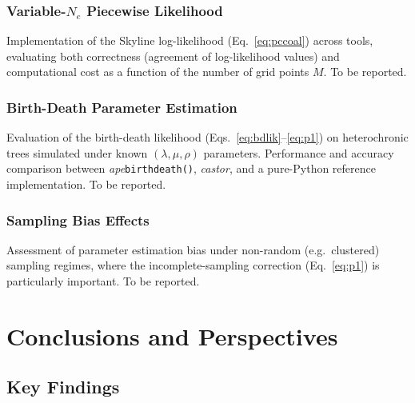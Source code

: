 \documentclass[11pt, a4paper]{article}
\newcommand{\ape}{\textit{ape}}
\newcommand{\castor}{\textit{castor}}
\begin{document}
\subsubsection{Variable-$N_e$ Piecewise Likelihood}

Implementation of the Skyline log-likelihood (Eq.~\ref{eq:pccoal}) across tools,
evaluating both correctness (agreement of log-likelihood values) and computational
cost as a function of the number of grid points $M$.
To be reported.

\subsubsection{Birth-Death Parameter Estimation}

Evaluation of the birth-death likelihood (Eqs.~\ref{eq:bdlik}--\ref{eq:p1}) on
heterochronic trees simulated under known $(\lambda, \mu, \rho)$ parameters.
Performance and accuracy comparison between \ape \texttt{birthdeath()}, \castor, and a
pure-Python reference implementation.
To be reported.

\subsubsection{Sampling Bias Effects}

Assessment of parameter estimation bias under non-random (e.g.\ clustered) sampling
regimes, where the incomplete-sampling correction (Eq.~\ref{eq:p1}) is particularly
important.
To be reported.

\section{Conclusions and Perspectives}

\subsection{Key Findings}
\end{document}
